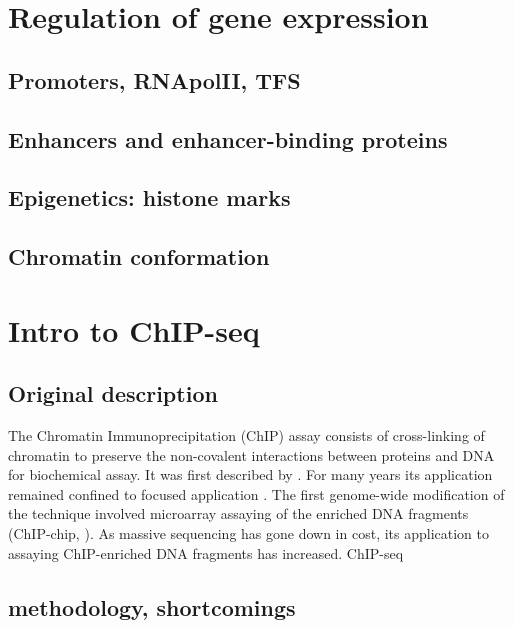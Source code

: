 \section{Regulation of gene expression}

\subsection{Promoters, RNApolII, TFS}

\subsection{Enhancers and enhancer-binding proteins}

\subsection{Epigenetics: histone marks}

\subsection{Chromatin conformation}

\section{Intro to ChIP-seq}

\subsection{Original description}
The Chromatin Immunoprecipitation (ChIP) assay consists of cross-linking of chromatin to preserve the non-covalent interactions between proteins and DNA for biochemical assay. It was first described by \cite{Solomon1988}. For many years its application remained confined to focused application \cite{Mardis2007}.  
The first genome-wide modification of the technique involved microarray assaying of the enriched DNA fragments (ChIP-chip, \cite{Ren2000}). As massive sequencing has gone down in cost, its application to assaying ChIP-enriched DNA fragments has increased. ChIP-seq \cite{Robertson2007}

\subsection{methodology, shortcomings}




